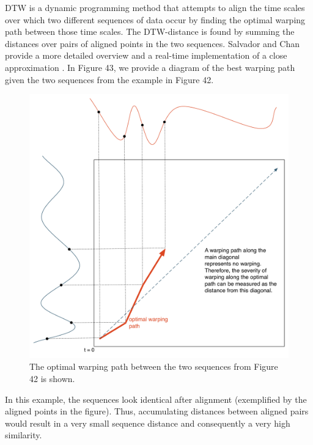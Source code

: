 \documentclass[12pt]{report} 	%
\numberwithin{figure}{chapter}
\numberwithin{table}{chapter}
\numberwithin{equation}{chapter}
\begin{document}
\begin{flushleft}
DTW is a dynamic programming method that attempts to align the time scales over which two different sequences of data occur by finding the optimal warping path between those time scales. The DTW-distance is found by summing the distances over pairs of aligned points in the two sequences. Salvador and Chan provide a more detailed overview and a real-time implementation of a close approximation \cite{Salvador:2004et}. In Figure 43, we provide a diagram of the best warping path given the two sequences from the example in Figure 42.
\begin{figure}[h!]
\begin{center}
\includegraphics[scale=0.5]{DTWExample}
\caption[Optimal warping path]{The optimal warping path between the two sequences from Figure 42 is shown.}
\end{center}
\vspace{6pt}
\end{figure}

In this example, the sequences look identical after alignment (exemplified by the aligned points in the figure). Thus, accumulating distances between aligned pairs would result in a very small sequence distance and consequently a very high similarity.


\end{flushleft}
\end{document}
